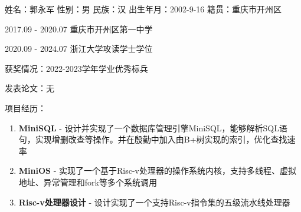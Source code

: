 \cleardoublepage
{}

姓名：郭永军 \quad 性别：男 \quad 民族：汉 \quad 出生年月：2002-9-16 \quad 籍贯：重庆市开州区

2017.09 - 2020.07 \quad 重庆市开州区第一中学

2020.09 - 2024.07 \quad 浙江大学攻读学士学位

获奖情况：2022-2023学年学业优秀标兵

发表论文：无

项目经历：

\begin{enumerate}
\item \textbf{MiniSQL} - 设计并实现了一个数据库管理引擎MiniSQL，能够解析SQL语句，实现增删改查等操作。并在殷勤中加入由B+树实现的索引，优化查找速率
\item \textbf{MiniOS} - 实现了一个基于Risc-v处理器的操作系统内核，支持多线程、虚拟地址、异常管理和fork等多个系统调用
\item \textbf{Risc-v处理器设计} - 设计实现了一个支持Risc-v指令集的五级流水线处理器
\end{enumerate}
